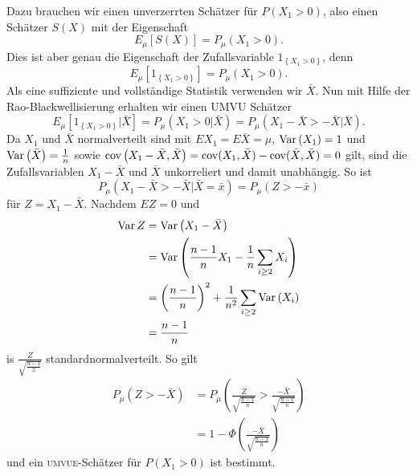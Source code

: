 Dazu brauchen wir einen unverzerrten Schätzer für $P\left( X_1 >0 \right)$, also einen
Schätzer $S(X)$ mit der Eigenschaft
\begin{equation*}
	E_\mu \left[ S(X) \right] = P_\mu(X_1 > 0).
\end{equation*}
Dies ist aber genau die Eigenschaft der Zufallsvariable $1_{ \left\{ X_1 > 0 \right\}  }$, denn
\begin{equation*}
	E_\mu \left[   1_{ \left\{ X_1 > 0 \right\}  }  \right] = P_\mu( X_1 > 0).
\end{equation*}
Als eine suffiziente und vollständige Statistik verwenden wir $\bar X$. Nun mit
Hilfe der Rao-Blackwellisierung erhalten wir einen \textsc{UMVU} Schätzer
\begin{equation*}
	E_\mu \left[ 1_{ \left\{ X_1 > 0 \right\}  } | \bar X \right]
	= P_\mu \left( X_1 > 0 | \bar X \right) 
	= P_\mu \left( X_1 - \bar X > -\bar X | \bar X \right).
\end{equation*}
Da $X_1$ und $\bar X$ normalverteilt sind mit $E X_1 = E \bar X = \mu$, 
$\operatorname{Var} \left( X_1 \right)=1$ und $\operatorname{Var}\left( \bar X \right) = \frac{1}{n}$ sowie
$\operatorname{cov} \left( X_1- \bar X, \bar X \right) = \operatorname{cov}(X_1, \bar X) - \operatorname{cov}(\bar X, \bar X) = 0$ gilt, 
sind die Zufallsvariablen $X_1 - \bar X$ und $\bar X$ unkorreliert und damit unabhängig. 
So ist
\begin{equation*}
	P_\mu \left( X_1 - \bar X > -\bar X | \bar X = \bar x \right) = P_\mu \left( Z > -\bar x  \right)
\end{equation*}
für $Z=X_1 - \bar X$. Nachdem $EZ=0$ und 
\begin{align*}
	\operatorname{Var} Z &= \operatorname{Var} \left( X_1- \bar X \right) \\
	&= \operatorname{Var} \left( \frac{n-1}{n} X_1 - \frac{1}{n} \sum_{i\geq 2}^{} X_i  \right) \\
	&= \left( \frac{n-1}{n} \right)^2 + \frac{1}{n^2} \sum_{i\geq 2}^{} \operatorname{Var} \left( X_i  \right) \\
	&= \frac{n-1}{ n}
\end{align*}
is $\frac{Z}{\sqrt{\frac{n-1}{2}}}$ standardnormalverteilt. So gilt
\begin{align*}
	P_\mu \left( Z > -\bar X \right) &= 
	P_\mu \left(  \frac{Z}{ \sqrt{\frac{n-1}{n}} } > \frac{-\bar X}{ \sqrt{\frac{n-1}{n}}   } \right) \\
	&= 1- \Phi\left( \frac{-\bar X}{ \sqrt{\frac{n-1}{n}}}    \right) 
\end{align*}
und ein \textsc{umvue}-Schätzer für $P\left( X_1 >0 \right)$ ist bestimmt.




